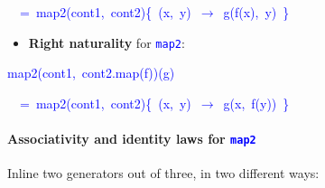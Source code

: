 \begin{itemize}
\begin{lyxcode}
\textcolor{blue}{\footnotesize{}~~=~map2(cont1,~cont2)\{~(x,~y)~$\rightarrow$~g(f(x),~y)~\}}{\footnotesize\par}
\end{lyxcode}
\begin{itemize}
\item \textbf{Right naturality} for \texttt{\textcolor{blue}{\footnotesize{}map2}}:
\end{itemize}
\begin{lyxcode}
\textcolor{blue}{\footnotesize{}map2(cont1,~cont2.map(f))(g)}{\footnotesize\par}

\textcolor{blue}{\footnotesize{}~~=~map2(cont1,~cont2)\{~(x,~y)~$\rightarrow$~g(x,~f(y))~\}}{\footnotesize\par}
\end{lyxcode}
\end{itemize}


\paragraph{Associativity and identity laws for \texttt{\textcolor{blue}{\footnotesize{}map2}} }

\vspace{-0.1cm}Inline two generators out of three, in two different
ways:\texttt{\textcolor{blue}{\footnotesize{}\smallskip{}
}}{\footnotesize\par}

